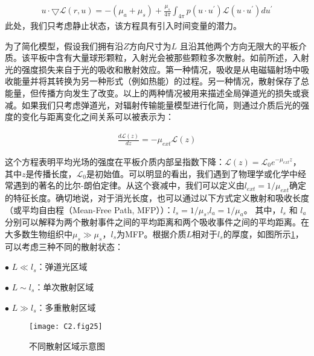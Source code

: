 \begin{equation}
\begin{aligned}
    u \cdot \bigtriangledown  \mathcal{L}(r, u) = -(\mu_{a} + \mu_{s})+\frac{\mu_{s}}{4\pi}\int_{4\pi} p(u·u^{\prime}) \mathcal{L}(u·u^{\prime}) d u^{\prime}
\end{aligned}
\label{eq:2.02}
\end{equation}
此处，我们只考虑静止状态，该方程具有引入时间变量的潜力。

为了简化模型，假设我们拥有沿$Z$方向尺寸为$L$ 且沿其他两个方向无限大的平板介质。该平板中含有大量球形颗粒，入射光会被那些颗粒多次散射。如前所述，入射光的强度损失来自于光的吸收和散射效应。第一种情况，吸收是从电磁辐射场中吸收能量并将其转换为另一种形式（例如热能）的过程。另一种情况，散射保存了总能量，但传播方向发生了改变。以上的两种情况被用来描述全局弹道光的损失或衰减。如果我们只考虑弹道光，对辐射传输能量模型进行化简，则通过介质后光的强度的变化与距离变化之间关系可以被表示为：

\begin{equation}
\begin{aligned}
    \frac{d\mathcal{L}(z)}{dz} = -\mu_{ext}\mathcal{L}(z)
\end{aligned}
\label{eq:2.03}
\end{equation}

这个方程表明平均光场的强度在平板介质内部呈指数下降：$\mathcal{L}(z) = \mathcal{L}_{0}e^{-\mu_{ext}z}$，其中$z$是传播长度，$\mathcal{L}_{0}$是初始值。可以明显的看出，我们遇到了物理学或化学中经常遇到的著名的比尔-朗伯定律。从这个衰减中，我们可以定义由$l_{ext}=1/\mu_{ext}$确定的特征长度。确切地说，对于消光长度，也可以通过以下方式定义散射和吸收长度（或平均自由程（Mean-Free Path, MFP））：$l_{s} = 1/\mu_{s}$,$l_{a} = 1/\mu_{a}$。
其中，$l_{s}$ 和 $l_{a}$分别可以解释为两个散射事件之间的平均距离和两个吸收事件之间的平均距离。在大多数生物组织中$\mu_{s} \gg \mu_{s}$，$l_{s}$为MFP。根据介质$L$相对于$l_{s}$的厚度，如图所示\ref{fig2:25}\cite{ntziachristos_going_2010}，可以考虑三种不同的散射状态\cite{ntziachristos_going_2010}：\par
$\bullet$ $ L \ll l_{s} $：弹道光区域\par
$\bullet$ $L \sim l_{s} $：单次散射区域\par
$\bullet$ $L \gg l_{s} $：多重散射区域\par

\begin{figure}[htp]
	\centering
	\texttt{[image: C2.fig25]}
	\caption{不同散射区域示意图}
	\label{fig2:25}
\end{figure}

